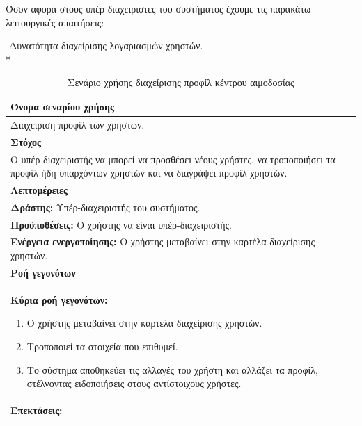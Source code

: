 			
Όσον αφορά στους υπέρ-διαχειριστές του συστήματος έχουμε τις παρακάτω λειτουργικές απαιτήσεις:


-Δυνατότητα διαχείρισης λογαριασμών χρηστών.
\\*
\begin{table}[H]
	\begin{center}
	    \begin{tabular}{|p{\dimexpr \linewidth-2\tabcolsep}|}
	    \hline
	    \rowcolor{grayy}
	    \textbf{Όνομα σεναρίου χρήσης}
	    \\ \hline    
	    Διαχείριση προφίλ των χρηστών.
	     \\ \hline
	    \rowcolor{grayy}
	    \textbf{\textbf{Στόχος}}
	    \\ \hline
	 	 Ο υπέρ-διαχειριστής να μπορεί να προσθέσει νέους χρήστες, να τροποποιήσει τα προφίλ ήδη υπαρχόντων χρηστών και να διαγράψει προφίλ χρηστών.
	     \\ \hline	    
	     \rowcolor{grayy}
	    \textbf{Λεπτομέρειες}
	    \\ \hline
		\textbf{Δράστης:} Υπέρ-διαχειριστής του συστήματος. 
		\\*
		\textbf{Προϋποθέσεις:} Ο χρήστης να είναι υπέρ-διαχειριστής.
		\\*
		\textbf{Ενέργεια ενεργοποίησης:} Ο χρήστης μεταβαίνει στην καρτέλα διαχείρισης χρηστών.
	    \\ \hline
		\rowcolor{grayy}    
	    \textbf{Ροή γεγονότων}
	    \\ \hline
		\textbf{Κύρια ροή γεγονότων:}
		\begin{enumerate}
			\item	 Ο χρήστης μεταβαίνει στην καρτέλα διαχείρισης χρηστών.
			\item Τροποποιεί τα στοιχεία που επιθυμεί.
			\item Το σύστημα αποθηκεύει τις αλλαγές του χρήστη και αλλάζει τα προφίλ, στέλνοντας ειδοποιήσεις στους αντίστοιχους χρήστες.
		\end{enumerate}
		\\ \hline
		\textbf{Επεκτάσεις:}
		   \\ \hline
	    \end{tabular}
	    \caption{Σενάριο χρήσης διαχείρισης προφίλ κέντρου αιμοδοσίας}
	    \label{tab:profile_management_superadmin}
	\end{center}
\end{table}	



